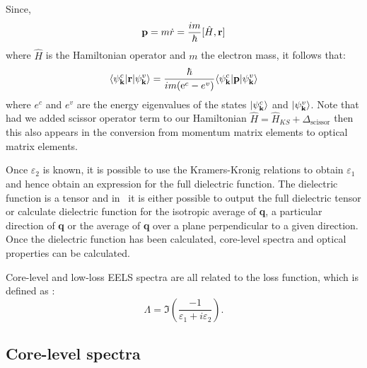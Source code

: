 \documentclass[a4paper,11pt,twoside]{book}
\newcommand{\e}{\mathrm{e}}
\begin{document}
Since,
\begin{equation}
{\bf p} = m\dot{r} =\frac{im}{\hbar} [\hat{H},{\bf r}]
\label{Eqn:velocity_op}
\end{equation}
where $\hat{H}$ is the Hamiltonian operator and $m$ the electron mass, it follows that:
\begin{equation}
\langle \psi^c_{\bf k}  |  {\bf r} | \psi^v_{\bf k} \rangle = \frac{\hbar} {im (\e^c-e^v)} \langle \psi^c_{\bf k}  |  {\bf p} | \psi^v_{\bf k} \rangle
\label{Eqn:pvr}
\end{equation}
where $e^c$ and $e^v$ are the energy eigenvalues of the states $|\psi^c_{\bf k} \rangle$ and $|\psi^v_{\bf k} \rangle$.
%
Note that had we added scissor operator term to our Hamiltonian $\hat{H} = \hat{H}_{KS} + \Delta_{\mathrm{scissor}}$ then this also appears in the conversion from momentum matrix elements to optical matrix elements.

Once $\varepsilon_2$ is known, it is possible to use the Kramers-Kronig relations to obtain $\varepsilon_1$ and hence obtain an expression for the full dielectric function.  The dielectric function is a tensor and in \optados\ it is either possible to output the full dielectric tensor or calculate dielectric function for the isotropic average of {\bf q}, a particular direction of {\bf q} or the average of {\bf q} over a plane perpendicular to a given direction.  Once the dielectric function has been calculated, core-level spectra and optical properties can be calculated.

Core-level and low-loss EELS spectra are all related to the loss function, which is defined as \cite{egerton}:
\begin{equation}
\Lambda = \Im \left ( \frac{-1}{\varepsilon_1 + i\varepsilon_2  } \right ).
\label{Eqn:LossFn}
\end{equation}


\subsection{Core-level spectra}
\end{document}

